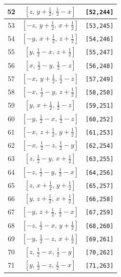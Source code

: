 \documentclass[fleqn,8pt]{jsarticle}
\begin{document}
\begin{longtable}{ccc}
52 & $\left[ z,\, y + \frac{1}{2},\, \frac{1}{2} - x \right]$ & {\tt [52,244]} \\ \hline
53 & $\left[ - z,\, y + \frac{1}{2},\, x + \frac{1}{2} \right]$ & {\tt [53,245]} \\ \hline
54 & $\left[ - y,\, x + \frac{1}{2},\, z + \frac{1}{2} \right]$ & {\tt [54,246]} \\ \hline
55 & $\left[ y,\, \frac{1}{2} - x,\, z + \frac{1}{2} \right]$ & {\tt [55,247]} \\ \hline
56 & $\left[ x,\, \frac{1}{2} - y,\, \frac{1}{2} - z \right]$ & {\tt [56,248]} \\ \hline
57 & $\left[ - x,\, y + \frac{1}{2},\, \frac{1}{2} - z \right]$ & {\tt [57,249]} \\ \hline
58 & $\left[ - x,\, \frac{1}{2} - y,\, z + \frac{1}{2} \right]$ & {\tt [58,250]} \\ \hline
59 & $\left[ y,\, x + \frac{1}{2},\, \frac{1}{2} - z \right]$ & {\tt [59,251]} \\ \hline
60 & $\left[ - y,\, \frac{1}{2} - x,\, \frac{1}{2} - z \right]$ & {\tt [60,252]} \\ \hline
61 & $\left[ - x,\, z + \frac{1}{2},\, y + \frac{1}{2} \right]$ & {\tt [61,253]} \\ \hline
62 & $\left[ - x,\, \frac{1}{2} - z,\, \frac{1}{2} - y \right]$ & {\tt [62,254]} \\ \hline
63 & $\left[ z,\, \frac{1}{2} - y,\, x + \frac{1}{2} \right]$ & {\tt [63,255]} \\ \hline
64 & $\left[ - z,\, \frac{1}{2} - y,\, \frac{1}{2} - x \right]$ & {\tt [64,256]} \\ \hline
65 & $\left[ z,\, x + \frac{1}{2},\, y + \frac{1}{2} \right]$ & {\tt [65,257]} \\ \hline
66 & $\left[ y,\, z + \frac{1}{2},\, x + \frac{1}{2} \right]$ & {\tt [66,258]} \\ \hline
67 & $\left[ - y,\, z + \frac{1}{2},\, \frac{1}{2} - x \right]$ & {\tt [67,259]} \\ \hline
68 & $\left[ - z,\, \frac{1}{2} - x,\, y + \frac{1}{2} \right]$ & {\tt [68,260]} \\ \hline
69 & $\left[ - y,\, \frac{1}{2} - z,\, x + \frac{1}{2} \right]$ & {\tt [69,261]} \\ \hline
70 & $\left[ z,\, \frac{1}{2} - x,\, \frac{1}{2} - y \right]$ & {\tt [70,262]} \\ \hline
71 & $\left[ y,\, \frac{1}{2} - z,\, \frac{1}{2} - x \right]$ & {\tt [71,263]} \\ \hline

\end{longtable}
\end{document}
